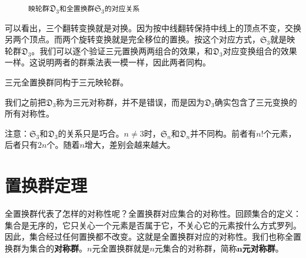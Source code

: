 \documentclass[12pt,UTF8,fontset=none]{ctexbook}
\begin{document}
\begin{figure}[htbp]
    \caption{\texttt{映轮群$\mathfrak{D}_3$和全置换群$\mathfrak{S}_3$的对应关系}}
\end{figure}

可以看出，三个翻转变换就是对换。因为按中线翻转保持中线上的顶点不变，交换另两个顶点。而两个旋转变换就是完全移位的置换。按这个对应方式，$\mathfrak{S}_3$就是映轮群$\mathfrak{D}_3$。我们可以逐个验证三元置换两两组合的效果，和$\mathfrak{D}_3$对应变换组合的效果一样。这说明两者的群乘法表一模一样，因此两者同构。

\begin{tm}\label{tm:4-20}
    三元全置换群同构于三元映轮群。
\end{tm}
我们之前把$\mathfrak{D}_3$称为三元对称群，并不是错误，而是因为$\mathfrak{D}_3$确实包含了三元变换的所有对称性。

注意：$\mathfrak{S}_3$和$\mathfrak{D}_3$的关系只是巧合。$n\neq 3$时，$\mathfrak{S}_n$和$\mathfrak{D}_n$并不同构。前者有$n!$个元素，后者只有$2n$个。随着$n$增大，差别会越来越大。

\section{置换群定理}
全置换群代表了怎样的对称性呢？全置换群对应集合的对称性。回顾集合的定义：集合是无序的，它只关心一个元素是否属于它，不关心它的元素按什么方式罗列。因此，集合经过任何置换都不改变。这就是全置换群对应的对称性。我们也称全置换群为集合的\textbf{对称群}。$n$元全置换群就是$n$元集合的对称群，简称$\boldsymbol{n}$\textbf{元对称群}。
\end{document}
